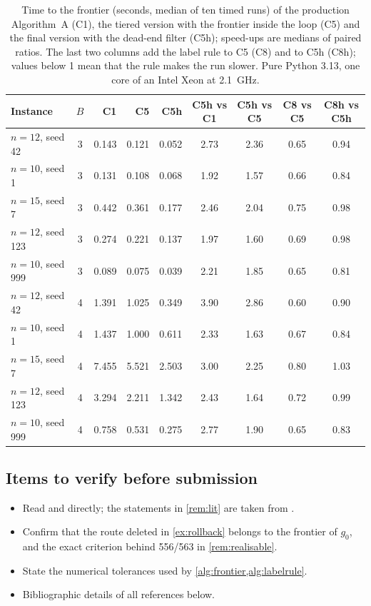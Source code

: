 \documentclass[11pt]{article}
\theoremstyle{definition}
\theoremstyle{remark}
\begin{document}
\begin{table}[!htbp]
\centering
\caption{Time to the frontier (seconds, median of ten timed runs) of the production Algorithm~A (C1), the tiered version with the frontier inside the loop (C5) and the final version with the dead-end filter (C5h); speed-ups are medians of paired ratios. The last two columns add the label rule to C5 (C8) and to C5h (C8h); values below 1 mean that the rule makes the run slower. Pure Python 3.13, one core of an Intel Xeon at 2.1~GHz.}
\label{tab:final}
\small
\setlength{\tabcolsep}{4pt}
\begin{tabular}{lcrrrcccc}
\toprule
Instance & $B$ & C1 & C5 & C5h & C5h vs C1 & C5h vs C5 & C8 vs C5 & C8h vs C5h\\
\midrule
$n=12$, seed 42 & 3 & 0.143 & 0.121 & 0.052 & 2.73 & 2.36 & 0.65 & 0.94\\
$n=10$, seed 1 & 3 & 0.131 & 0.108 & 0.068 & 1.92 & 1.57 & 0.66 & 0.84\\
$n=15$, seed 7 & 3 & 0.442 & 0.361 & 0.177 & 2.46 & 2.04 & 0.75 & 0.98\\
$n=12$, seed 123 & 3 & 0.274 & 0.221 & 0.137 & 1.97 & 1.60 & 0.69 & 0.98\\
$n=10$, seed 999 & 3 & 0.089 & 0.075 & 0.039 & 2.21 & 1.85 & 0.65 & 0.81\\
\midrule
$n=12$, seed 42 & 4 & 1.391 & 1.025 & 0.349 & 3.90 & 2.86 & 0.60 & 0.90\\
$n=10$, seed 1 & 4 & 1.437 & 1.000 & 0.611 & 2.33 & 1.63 & 0.67 & 0.84\\
$n=15$, seed 7 & 4 & 7.455 & 5.521 & 2.503 & 3.00 & 2.25 & 0.80 & 1.03\\
$n=12$, seed 123 & 4 & 3.294 & 2.211 & 1.342 & 2.43 & 1.64 & 0.72 & 0.99\\
$n=10$, seed 999 & 4 & 0.758 & 0.531 & 0.275 & 2.77 & 1.90 & 0.65 & 0.83\\
\bottomrule
\end{tabular}
\end{table}

\FloatBarrier
\subsection{Items to verify before submission}

\begin{itemize}[leftmargin=1.4em, itemsep=1pt]
\item Read \citet{sol1994column} and \citet{vanderbeck1994thesis} directly; the
statements in \cref{rem:lit} are taken from \citet{lubbecke2005selected}.
\item Confirm that the route deleted in \cref{ex:rollback} belongs to the
frontier of $g_0$, and the exact criterion behind 556/563 in
\cref{rem:realisable}.
\item State the numerical tolerances used by \cref{alg:frontier,alg:labelrule}.
\item Bibliographic details of all references below.
\end{itemize}
\end{document}
